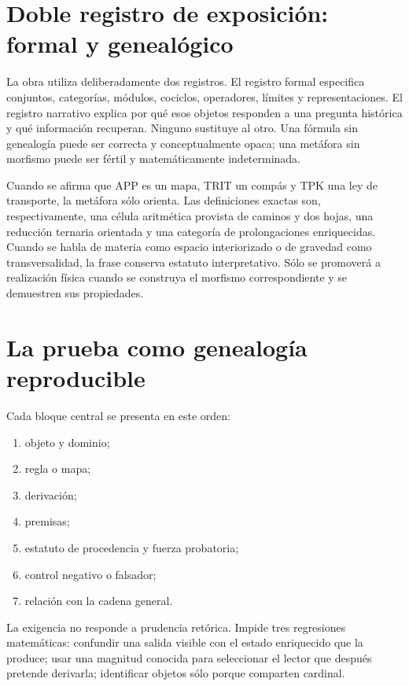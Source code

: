 \section*{Doble registro de exposición: formal y genealógico}

La obra utiliza deliberadamente dos registros. El registro formal especifica
conjuntos, categorías, módulos, cociclos, operadores, límites y
representaciones. El registro narrativo explica por qué esos objetos responden
a una pregunta histórica y qué información recuperan. Ninguno sustituye al
otro. Una fórmula sin genealogía puede ser correcta y conceptualmente opaca;
una metáfora sin morfismo puede ser fértil y matemáticamente indeterminada.

Cuando se afirma que APP es un mapa, TRIT un compás y TPK una ley de
transporte, la metáfora sólo orienta. Las definiciones exactas son,
respectivamente, una célula aritmética provista de caminos y dos hojas, una
reducción ternaria orientada y una categoría de prolongaciones enriquecidas.
Cuando se habla de materia como espacio interiorizado o de gravedad como
transversalidad, la frase conserva estatuto interpretativo. Sólo se promoverá
a realización física cuando se construya el morfismo correspondiente y se
demuestren sus propiedades.

\section*{La prueba como genealogía reproducible}

Cada bloque central se presenta en este orden:

\begin{enumerate}
\item objeto y dominio;
\item regla o mapa;
\item derivación;
\item premisas;
\item estatuto de procedencia y fuerza probatoria;
\item control negativo o falsador;
\item relación con la cadena general.
\end{enumerate}

La exigencia no responde a prudencia retórica. Impide tres regresiones
matemáticas: confundir una salida visible con el estado enriquecido que la
produce; usar una magnitud conocida para seleccionar el lector que después
pretende derivarla; identificar objetos sólo porque comparten cardinal.

